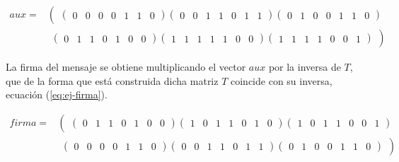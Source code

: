 \begin{equation}\label{eq:ej-aux}
	\begin{aligned}
	{aux} = & 
		\left(\begin{matrix}
			\left(\begin{smallmatrix}0 & 0 & 0 & 0 & 1 & 1 & 0\end{smallmatrix}\right)		
			\left(\begin{smallmatrix}0 & 0 & 1 & 1 & 0 & 1 & 1\end{smallmatrix}\right)
			\left(\begin{smallmatrix}0 & 1 & 0 & 0 & 1 & 1 & 0\end{smallmatrix}\right)\end{matrix}\right.\\
			&\left.\begin{matrix}\left(\begin{smallmatrix}0 & 1 & 1 & 0 & 1 & 0 & 0\end{smallmatrix}\right)
			\left(\begin{smallmatrix}1 & 1 & 1 & 1 & 1 & 0 & 0\end{smallmatrix}\right)
			\left(\begin{smallmatrix}1 & 1 & 1 & 1 & 0 & 0 & 1\end{smallmatrix}\right)
		\end{matrix}\right)
	\end{aligned}
\end{equation}

La firma del mensaje se obtiene multiplicando el vector $aux$ por la inversa de $T$, que de la forma que está construida dicha matriz $T$ coincide con su inversa, ecuación (\ref{eq:ej-firma}).

\begin{equation}\label{eq:ej-firma}
	\begin{aligned}
	{firma} =&
		\left(\begin{matrix}
			\left(\begin{smallmatrix}0 & 1 & 1 & 0 & 1 & 0 & 0\end{smallmatrix}\right)			
			\left(\begin{smallmatrix}1 & 0 & 1 & 1 & 0 & 1 & 0\end{smallmatrix}\right)
			\left(\begin{smallmatrix}1 & 0 & 1 & 1 & 0 & 0 & 1\end{smallmatrix}\right)\end{matrix}\right.
			\\
			& \left.\begin{matrix}\left(\begin{smallmatrix}0 & 0 & 0 & 0 & 1 & 1 & 0\end{smallmatrix}\right)			
			\left(\begin{smallmatrix}0 & 0 & 1 & 1 & 0 & 1 & 1\end{smallmatrix}\right)
			\left(\begin{smallmatrix}0 & 1 & 0 & 0 & 1 & 1 & 0\end{smallmatrix}\right)
		\end{matrix}\right)
	\end{aligned}
\end{equation}

